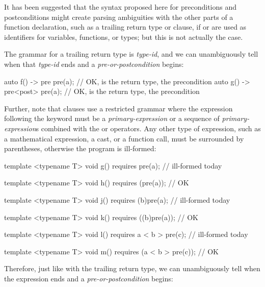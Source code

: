 It has been suggested that the syntax proposed here for preconditions and postconditions might create parsing ambiguities with the other parts of a function declaration, such as a trailing return type or  clause, if  or  are used as identifiers for variables, functions, or types; but this is not actually the case.

The grammar for a trailing return type is \tcode{->} \emph{type-id}, and we can unambiguously tell when that \emph{type-id} ends and a \emph{pre-or-postcondition} begins:

\begin{codeblock}
auto f() -> pre pre(a);   // OK,  is the return type,  the precondition
auto g() -> pre<post> pre(a);  // OK,  is the return type,  the precondition
\end{codeblock}

Further, note that  clauses use a restricted grammar where the expression following the  keyword must be a \emph{primary-expression} or a sequence of \emph{primary-expression}s combined with the \tcode{\&\&} or \tcode{||} operators. Any other type of expression, such as a mathematical expression, a cast, or a function call, must be surrounded by parentheses, otherwise the program is ill-formed:

\begin{codeblock}
template <typename T>
void g() requires pre(a);   // ill-formed today

template <typename T>
void h() requires (pre(a));   // OK

template <typename T>
void j() requires (b)pre(a);   // ill-formed today

template <typename T>
void k() requires ((b)pre(a));   // OK

template <typename T>
void l() requires a < b > pre(c);   // ill-formed today

template <typename T>
void m() requires (a < b > pre(c));   // OK

\end{codeblock}

Therefore, just like with the trailing return type, we can unambiguously tell when the expression ends and a \emph{pre-or-postcondition} begins:

